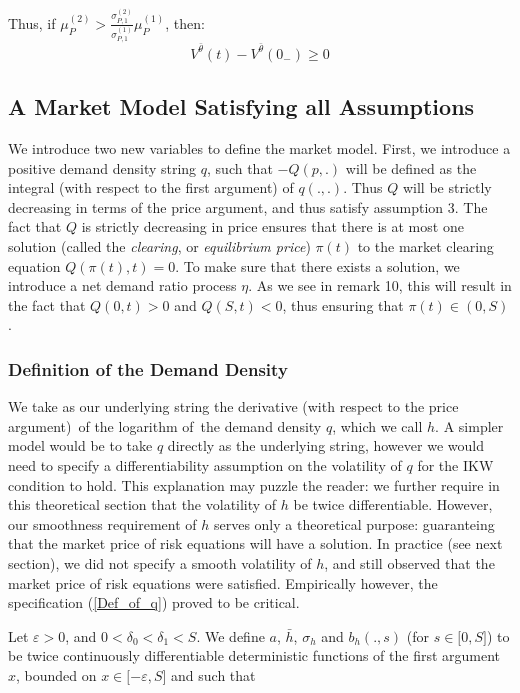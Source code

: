 \documentclass{article}
\begin{document}
Thus, if $\mu _{P}^{(2)}>\frac{\sigma _{P,1}^{(2)}}{\sigma _{P,1}^{(1)}}\mu
_{P}^{(1)}$, then:
\begin{equation*}
V^{\bar{\theta}}(t)-V^{\bar{\theta}}(0_{-})\geq 0
\end{equation*}%
\pagebreak

\subsection{A Market Model Satisfying all Assumptions}

We introduce two new variables to define the market model. First, we
introduce a positive demand density string $q$, such that $-Q(p,.)$ will be
defined as the integral (with respect to the first argument) of $q(.,.)$.
Thus $Q$ will be strictly decreasing in terms of the price argument, and
thus satisfy assumption 3. The fact that $Q$ is strictly decreasing in price
ensures that there is at most one solution (called the \textit{clearing}, or
\textit{equilibrium price}) $\pi (t)$ to the market clearing equation $Q(\pi
(t),t)=0$. To make sure that there exists a solution, we introduce a net
demand ratio process $\eta $. As we see in remark 10, this will result in
the fact that $Q(0,t)>0$ and $Q(S,t)<0$, thus ensuring that $\pi (t)\in (0,S)
$.

\subsubsection{Definition of the Demand Density}

We take as our underlying string the derivative (with respect to the price
argument)\ of the logarithm of\ the demand density $q$, which we call $h$. A
simpler model would be to take $q$ directly as the underlying string,
however we would need to specify a differentiability assumption on the
volatility of $q$ for the IKW condition to hold. This explanation may puzzle
the reader: we further require in this theoretical section that the
volatility of $h$ be twice differentiable. However, our smoothness
requirement of $h$ serves only a theoretical purpose: guaranteing that the
market price of risk equations will have a solution. In practice (see next
section), we did not specify a smooth volatility of $h$, and still observed
that the market price of risk equations were satisfied. Empirically however,
the specification (\ref{Def_of_q}) proved to be critical.

\bigskip

Let $\varepsilon >0$, and $0<\delta _{0}<\delta _{1}<S$. We define $a$, $%
\bar{h}$, $\sigma _{h}$ and $b_{h}(.,s)$ (for $s\in \lbrack 0,S]$) to be
twice continuously differentiable deterministic functions of the first
argument $x$, bounded on $x\in \lbrack -\varepsilon ,S]$ and such that
\end{document}
